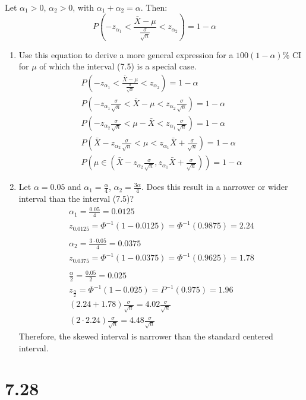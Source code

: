 \documentclass[letterpaper,12pt,fleqn]{article}
\renewcommand{\a}{\alpha}
\newcommand{\m}{\mu}
\renewcommand{\o}{\sigma}
\renewcommand{\P}{\Phi}
\newcommand{\zadt}{z_{\frac{\a}{2}}}
\begin{document}
Let \(\a_1>0\), \(\a_2>0\), with \(\a_1+\a_2=\a\).  Then:
\[P\left(-z_{\a_1}<\frac{\bar{X}-\m}{\frac{\o}{\sqrt{n}}}<z_{\a_2}\right)=1-\a\]
\begin{enumerate}[label={\alph*)}]
\item Use this equation to derive a more general expression for a \(100(1-\a)\%\) CI for \(\m\) of which the interval (7.5) is
  a special case.
  \begin{gather*}
    P\left(-z_{\a_1}<\frac{\bar{X}-\m}{\frac{\o}{\sqrt{n}}}<z_{\a_2}\right)=1-\a \\
    P\left(-z_{\a_1}\frac{\o}{\sqrt{n}}<\bar{X}-\m<z_{\a_2}\frac{\o}{\sqrt{n}}\right)=1-\a \\
    P\left(-z_{\a_2}\frac{\o}{\sqrt{n}}<\m-\bar{X}<z_{\a_1}\frac{\o}{\sqrt{n}}\right)=1-\a \\
    P\left(\bar{X}-z_{\a_2}\frac{\o}{\sqrt{n}}<\m<z_{\a_1}\bar{X}+\frac{\o}{\sqrt{n}}\right)=1-\a \\
    P\left(\m\in\left(\bar{X}-z_{\a_2}\frac{\o}{\sqrt{n}},z_{\a_1}\bar{X}+\frac{\o}{\sqrt{n}}\right)\right)=1-\a
  \end{gather*}
\item Let \(\a=0.05\) and \(\a_1=\frac{\a}{4}\), \(\a_2=\frac{3\a}{4}\).  Does this result in a narrower or wider interval
  than the interval (7.5)?
  \begin{gather*}
    \a_1=\frac{0.05}{4}=0.0125 \\
    z_{0.0125}=\P^{-1}(1-0.0125)=\P^{-1}(0.9875)=2.24 \\
    \\
    \a_2=\frac{3\cdot0.05}{4}=0.0375 \\
    z_{0.0375}=\P^{-1}(1-0.0375)=\P^{-1}(0.9625)=1.78 \\
    \\
    \frac{\a}{2}=\frac{0.05}{2}=0.025 \\
    \zadt=\P^{-1}(1-0.025)=P^{-1}(0.975)=1.96
    \\
    (2.24+1.78)\frac{\o}{\sqrt{n}}=4.02\frac{\o}{\sqrt{n}} \\
    (2\cdot2.24)\frac{\o}{\sqrt{n}}=4.48\frac{\o}{\sqrt{n}}
  \end{gather*}
  Therefore, the skewed interval is narrower than the standard centered interval.
\end{enumerate}

\section*{7.28}
\end{document}
